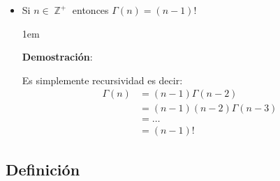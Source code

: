 \documentclass[12pt, fleqn]{report}                             %
\newenvironment{SmallIndentation}[1][0.75em]                    %
        {\begin{adjustwidth}{#1}{}\begin{footnotesize}}             %
        {\end{footnotesize}\end{adjustwidth}}                       %
\theoremstyle{break}                                            %
\DeclareMathOperator \Integers     {\mathbb{Z}}                 %
\DeclareMathOperator \Evaluate  {\Big|}                         %
\begin{document}
\begin{itemize}
\begin{SmallIndentation}[1em]
                                Entonces decimos que:
                                \begin{align*}
                                    \Gamma(a)
                                        &= \int_0^\infty x^{a - 1} \; e^{-x} dx         \\   
                                        &= -x^{a-1} e^{-x} \Evaluate_0^\infty + 
                                            \int_0^\infty e^{-x} (a - 1)x^{a - 2} dx     \\
                                        &= \Gamma(a) = (a - 1)\Gamma(a - 1)
                                \end{align*}
                            
                            \end{SmallIndentation}
                                

                        \item Si $n \in \Integers^+$ entonces $\Gamma(n) = (n-1)!$

                        \begin{SmallIndentation}[1em]
                            \textbf{Demostración}:
                            
                            Es simplemente recursividad es decir:
                            \begin{align*}
                                \Gamma(n)
                                    &= (n-1)\Gamma(n-2)         \\
                                    &= (n-1)(n-2)\Gamma(n-3)    \\
                                    &= \dots                    \\
                                    &= (n-1)!
                            \end{align*}
                        
                        \end{SmallIndentation}
                            
                    \end{itemize}


            \subsection{Definición}
\end{document}
